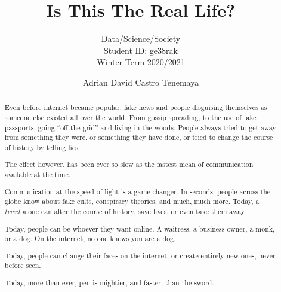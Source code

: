 \documentclass[sigconf,nonacm]{acmart}
\begin{document}
\title{Is This The Real Life?}
\subtitle{Data/Science/Society \\ Student ID: ge38rak \\ Winter Term 2020/2021}

\author{Adrian David Castro Tenemaya}

\begin{abstract}
  Even before internet became popular, fake news and people disguising themselves as someone else existed all over the world. From gossip spreading, to the use of fake passports, going ``off the grid'' and living in the woods. People always tried to get away from something they were, or something they have done, or tried to change the course of history by telling lies.

  The effect however, has been ever so slow as the fastest mean of communication available at the time.

  Communication at the speed of light is a game changer. In seconds, people across the globe know about fake cults, conspiracy theories, and much, much more.
  Today, a \textit{tweet} alone can alter the course of history, save lives, or even take them away.

  Today, people can be whoever they want online. A waitress, a business owner, a monk, or a dog. On the internet, no one knows you are a dog.

  Today, people can change their faces on the internet, or create entirely new ones, never before seen.

  Today, more than ever, pen is mightier, and faster, than the sword.
\end{abstract}

\maketitle











\end{document}
